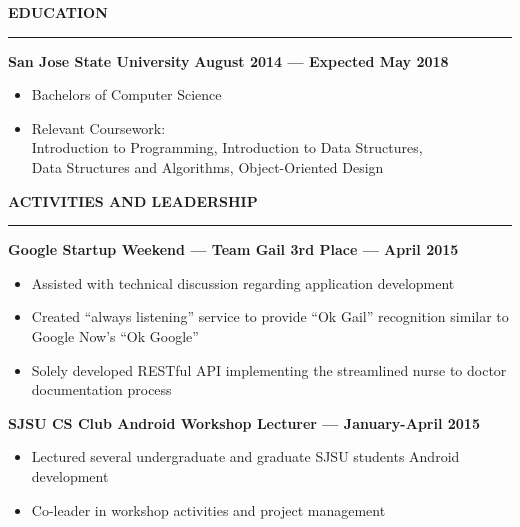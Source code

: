 \documentclass[10pt, oneside]{letter}
\newcommand{\linespaceshit} {
  \vspace{0.05in}
  \hrule
  \vspace{0.05in}
}
\begin{document}
  \textbf{EDUCATION}
  \linespaceshit
    \begin{adjustwidth}{0.1in}{0pt}
      \textbf{San Jose State University} \hfill \textbf{August 2014 --- Expected May 2018}
      \begin{itemize}
        \item Bachelors of Computer Science
        \item Relevant Coursework: \\
          \hspace*{0.5in} Introduction to Programming, Introduction to Data Structures, \\
          \hspace*{0.5in} Data Structures and Algorithms, Object-Oriented Design
      \end{itemize}
    \end{adjustwidth}

  \textbf{ACTIVITIES AND LEADERSHIP}
  \linespaceshit
    \textbf{Google Startup Weekend --- Team Gail 3rd Place --- April 2015}
    \begin{adjustwidth}{0.2in}{0pt}
      \begin{itemize}
        \item Assisted with technical discussion regarding application development
        \item Created ``always listening'' service to provide ``Ok Gail'' recognition similar to Google Now's ``Ok Google''
        \item Solely developed RESTful API implementing the streamlined nurse to doctor documentation process
      \end{itemize}
    \end{adjustwidth}

    \textbf{SJSU CS Club Android Workshop Lecturer --- January-April 2015}
    \begin{adjustwidth}{0.2in}{0pt}
      \begin{itemize}
        \item Lectured several undergraduate and graduate SJSU students Android development
        \item Co-leader in workshop activities and project management
      \end{itemize}
    \end{adjustwidth}
\end{document}
